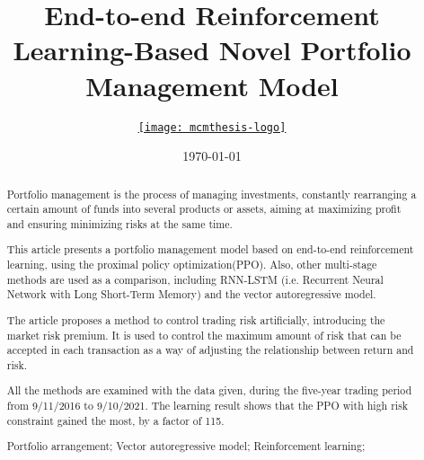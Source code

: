 \documentclass{mcmthesis}
\title{End-to-end Reinforcement Learning-Based Novel Portfolio Management Model}
\author{\small \href{MCM 2022 Team 2207690}
  {\texttt{[image: mcmthesis-logo]}}}
\date{\today}
\begin{document}
\begin{abstract}





Portfolio management is the process of managing investments,
constantly rearranging a certain amount of funds into several products or assets,
aiming at maximizing profit and ensuring minimizing risks at the same time.

This article presents a portfolio management model based on end-to-end reinforcement learning, using the proximal policy optimization(PPO).
Also, other multi-stage methods are used as a comparison, including RNN-LSTM (i.e. Recurrent Neural Network with Long Short-Term Memory) and the vector autoregressive model.

The article proposes a method to control trading risk artificially, introducing the market risk premium.
It is used to control the maximum amount of risk that can be accepted in each transaction as a way of adjusting the relationship between return and risk.

All the methods are examined with the data given, during the five-year trading period from 9/11/2016 to 9/10/2021.
The learning result shows that the PPO with high risk constraint gained the most, by a factor of 115.

\begin{keywords}
Portfolio arrangement; Vector autoregressive model; Reinforcement learning;
\end{keywords}
\end{abstract}
\maketitle

\tableofcontents
\newpage
\end{document}
